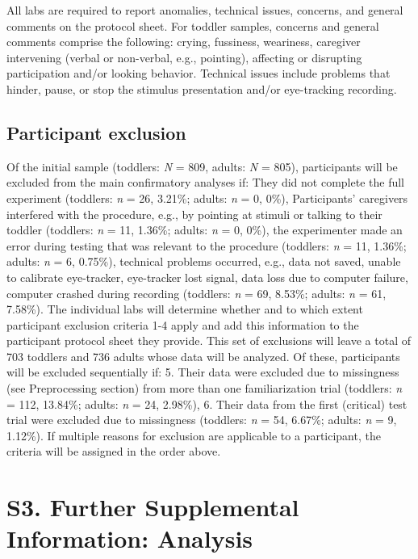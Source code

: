 \documentclass[
  man, donotrepeattitle,floatsintext]{apa6}
\begin{document}
All labs are required to report anomalies, technical issues, concerns, and general comments on the protocol sheet. For toddler samples, concerns and general comments comprise the following: crying, fussiness, weariness, caregiver intervening (verbal or non-verbal, e.g., pointing), affecting or disrupting participation and/or looking behavior. Technical issues include problems that hinder, pause, or stop the stimulus presentation and/or eye-tracking recording.

\subsection{Participant exclusion}\label{participant-exclusion}

Of the initial sample (toddlers: \emph{N} = 809, adults: \emph{N} = 805), participants will be excluded from the main confirmatory analyses if:
They did not complete the full experiment (toddlers: \emph{n} = 26, 3.21\%; adults: \emph{n} = 0, 0\%),
Participants' caregivers interfered with the procedure, e.g., by pointing at stimuli or talking to their toddler (toddlers: \emph{n} = 11, 1.36\%; adults: \emph{n} = 0, 0\%),
the experimenter made an error during testing that was relevant to the procedure (toddlers: \emph{n} = 11, 1.36\%; adults: \emph{n} = 6, 0.75\%),
technical problems occurred, e.g., data not saved, unable to calibrate eye-tracker, eye-tracker lost signal, data loss due to computer failure, computer crashed during recording (toddlers: \emph{n} = 69, 8.53\%; adults: \emph{n} = 61, 7.58\%).
The individual labs will determine whether and to which extent participant exclusion criteria 1-4 apply and add this information to the participant protocol sheet they provide. This set of exclusions will leave a total of 703 toddlers and 736 adults whose data will be analyzed. Of these, participants will be excluded sequentially if:
5. Their data were excluded due to missingness (see Preprocessing section) from more than one familiarization trial (toddlers: \emph{n} = 112, 13.84\%; adults: \emph{n} = 24, 2.98\%),
6. Their data from the first (critical) test trial were excluded due to missingness (toddlers: \emph{n} = 54, 6.67\%; adults: \emph{n} = 9, 1.12\%).
If multiple reasons for exclusion are applicable to a participant, the criteria will be assigned in the order above.

\section{S3. Further Supplemental Information: Analysis}\label{s3.-further-supplemental-information-analysis}
\end{document}
